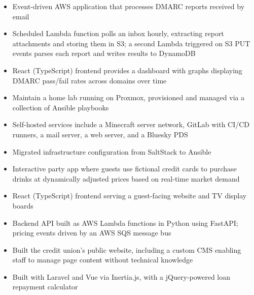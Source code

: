 

\begin{itemize}[topsep=2pt]
    \item Event-driven AWS application that processes DMARC reports received by email
    \item Scheduled Lambda function polls an inbox hourly, extracting report attachments and storing them in S3; a second Lambda triggered on S3 PUT events parses each report and writes results to DynamoDB
    \item React (TypeScript) frontend provides a dashboard with graphs displaying DMARC pass/fail rates across domains over time
\end{itemize}

\begin{itemize}[topsep=2pt]
    \item Maintain a home lab running on Proxmox, provisioned and managed via a collection of Ansible playbooks
    \item Self-hosted services include a Minecraft server network, GitLab with CI/CD runners, a mail server, a web server, and a Bluesky PDS
    \item Migrated infrastructure configuration from SaltStack to Ansible
\end{itemize}

\begin{itemize}[topsep=2pt]
    \item Interactive party app where guests use fictional credit cards to purchase drinks at dynamically adjusted prices based on real-time market demand
    \item React (TypeScript) frontend serving a guest-facing website and TV display boards
    \item Backend API built as AWS Lambda functions in Python using FastAPI; pricing events driven by an AWS SQS message bus
\end{itemize}

\begin{itemize}[topsep=2pt]
    \item Built the credit union's public website, including a custom CMS enabling staff to manage page content without technical knowledge
    \item Built with Laravel and Vue via Inertia.js, with a jQuery-powered loan repayment calculator
\end{itemize}
